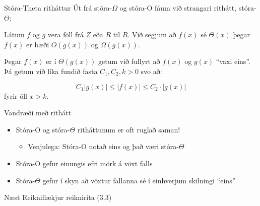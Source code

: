 \documentclass{beamer}
\begin{document}
\begin{frame}{Stóra-Theta ritháttur}
Út frá stóra-$\Omega$ og stóra-O fáum við strangari rithátt, stóra-$\Theta$:

\begin{tcolorbox}[title=$\Theta$ ritháttur]
Látum $f$ og $g$ vera föll frá $Z$ eða $R$ til $R$. Við segjum að $f(x)$ sé $\Theta(x)$ þegar $f(x)$ er bæði $O(g(x))$ og $\Omega(g(x))$.
\end{tcolorbox}
Þegar $f(x)$ er í $\Theta(g(x))$ getum við fullyrt að $f(x)$ og $g(x)$ ``vaxi eins''. Þá getum við líka fundið fasta $C_1, C_2, k > 0$ svo að:

\[
 C_1|g(x)| \leq |f(x)| \leq C_2 \cdot |g(x)|
\]
fyrir öll $x > k$.
\end{frame}

\begin{frame}{Vandræði með rithátt}
\begin{itemize}
 \item Stóra-O og stóra-$\Theta$ ritháttunum er oft ruglað saman!
 \begin{itemize}
  \item Venjulega: Stóra-O notað eins og það væri stóra-$\Theta$
 \end{itemize}
 \item Stóra-O gefur einungis efri mörk á vöxt falls
 \item Stóra-$\Theta$ gefur í skyn að vöxtur fallanna sé í einhverjum skilningi ``eins''
\end{itemize}
\end{frame}

\begin{frame}{Næst}
Reikniflækjur reiknirita (3.3)
\end{frame}
\end{document}
